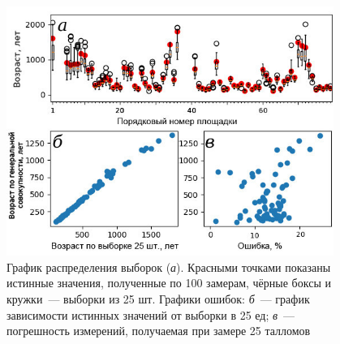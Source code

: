 \begin{figure}[H]
  \begin{center}
    \includegraphics[width=0.95\textwidth]{authors/kolegov-fig2.jpg}
  \end{center}
  \vspace{-0.5cm}
  \caption{График распределения выборок (\textit{а}). Красными точками показаны истинные значения,
полученные по 100 замерам, чёрные боксы и кружки~--- выборки из 25 шт. Графики ошибок: \textit{б}~--- график зависимости истинных значений от выборки в 25 ед; \textit{в}~--- погрешность измерений, получаемая при замере 25 талломов}
  \label{fig:kolegov}
\end{figure}
